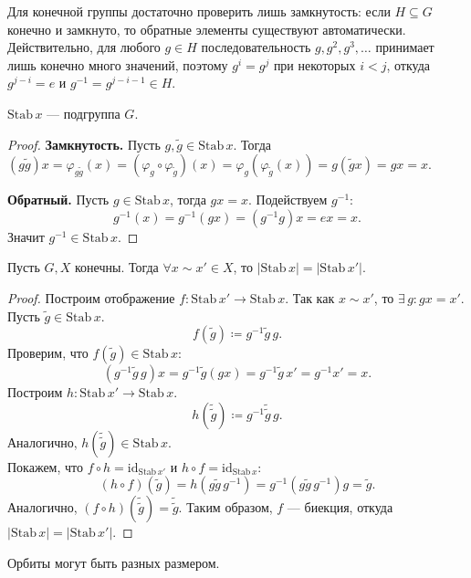 \begin{remark}
    Для конечной группы достаточно проверить лишь замкнутость: если $H \subseteq G$ конечно и замкнуто,
    то обратные элементы существуют автоматически. Действительно, для любого $g \in H$ последовательность
    $g, g^2, g^3, \ldots$ принимает
    лишь конечно много значений, поэтому $g^i = g^j$ при некоторых $i < j$, откуда $g^{j-i} = e$ и $g^{-1} = g^{j-i-1} \in H$.
\end{remark}

\begin{stmt}
    $\mathrm{Stab}\, x$ --- подгруппа $G$.
    \begin{proof}
        \textbf{Замкнутость.} Пусть $g, \tilde{g} \in \mathrm{Stab}\, x$. Тогда $(g\tilde{g})x
         = \varphi_{g\tilde{g}}(x) = (\varphi_g \circ \varphi_{\tilde{g}})(x)
        = \varphi_g(\varphi_{\tilde{g}}(x)) = g(\tilde{g}x) = gx = x$.

        \textbf{Обратный.} Пусть $g \in \mathrm{Stab}\, x$, тогда $gx = x$. Подействуем $g^{-1}$:
        \[
            g^{-1}(x) = g^{-1}(gx) = (g^{-1}g)x = ex = x.
        \]
        Значит $g^{-1} \in \mathrm{Stab}\, x$.
    \end{proof}
\end{stmt}


\begin{stmt}
    Пусть $G, X$ конечны. Тогда $\forall x \sim x' \in X $, то $|\mathrm{Stab}\, x| = |\mathrm{Stab}\, x'|$.
    \begin{proof}
        Построим отображение $f\colon \mathrm{Stab}\, x' \to \mathrm{Stab}\, x$.
        Так как $x \sim x'$, то $\exists\, g\colon gx = x'$.
        Пусть $\tilde{g} \in \mathrm{Stab}\, x$.
        \[
            f(\tilde{g}) \coloneqq g^{-1} \tilde{g}\, g.
        \]
        Проверим, что $f(\tilde{g}) \in \mathrm{Stab}\, x$:
        \[
            (g^{-1}\tilde{g}\, g) x = g^{-1}\tilde{g}(gx) = g^{-1}\tilde{g}\, x' = g^{-1} x' = x.
        \]
        Построим $h\colon \mathrm{Stab}\, x' \to \mathrm{Stab}\, x$.
        \[
            h(\tilde{\tilde{g}}) \coloneqq g^{-1} \tilde{\tilde{g}}\, g.
        \]
        Аналогично, $h(\tilde{\tilde{g}}) \in \mathrm{Stab}\, x$. \\
        Покажем, что $f \circ h = \mathrm{id}_{\mathrm{Stab}\, x'}$ и $h \circ f = \mathrm{id}_{\mathrm{Stab}\, x}$:
        \[
            (h \circ f)(\tilde{g}) = h(g\tilde{g}\, g^{-1}) = g^{-1}(g\tilde{g}\, g^{-1})g = \tilde{g}.
        \]
        Аналогично, $(f \circ h)(\tilde{\tilde{g}}) = \tilde{\tilde{g}}$.
        Таким образом, $f$ — биекция, откуда $|\mathrm{Stab}\, x| = |\mathrm{Stab}\, x'|$.    \end{proof}


    \begin{remark}
        Орбиты могут быть разных размером.
    \end{remark}
\end{stmt}


